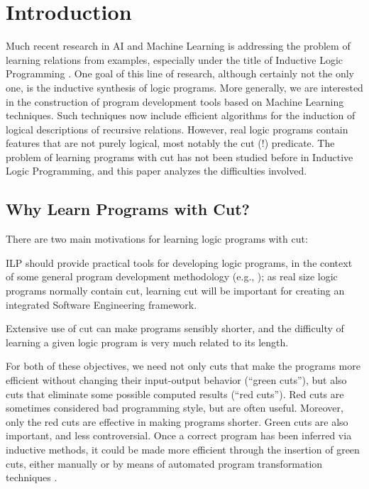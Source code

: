 \small
\normalsize
 
\section{Introduction}
 
Much recent research in AI and Machine Learning
is addressing the problem of learning
relations from examples, especially under the
title of Inductive Logic Programming
\cite{muggilpw91}.
One goal of this line of research,
although certainly not the only one, is the
inductive synthesis of logic programs. More generally,
we are interested in the
construction of program development tools
based on Machine Learning techniques.
Such techniques now include efficient algorithms for
the induction of logical descriptions of recursive relations.
However, real logic programs contain features that are not
purely logical, most notably the cut (!) predicate.
The problem of learning programs with cut has
not been studied before in Inductive Logic Programming,
and this paper analyzes the difficulties involved.
 
\subsection{Why Learn Programs with Cut?}
 
There are two main motivations for learning logic programs
with cut:
 
\begin{enumerate}
\begin{item}
ILP should provide practical tools for developing logic programs,
in the context of some general program development methodology
(e.g., \cite{bergsigs93});
as real size
logic programs normally contain cut, learning cut will
be important for creating an integrated Software
Engineering framework.
\end{item}
\begin{item}
Extensive use of cut can make programs sensibly shorter, and
the difficulty of learning a given logic program is
very much related to its length.
\end{item}
\end{enumerate}
 
For both of these objectives, we need not only cuts that
make the programs more efficient without changing their input-output
behavior (``green cuts''), but also cuts
that eliminate some possible computed results (``red cuts'').
Red cuts are sometimes considered
bad programming style, but are often useful.
Moreover, only the red cuts
are effective in making programs shorter.
Green cuts are also important, and less controversial.
Once a correct program has been inferred via inductive methods,
it could be made more efficient through the insertion of
green cuts, either manually or by means of automated
program transformation techniques \cite{lopstrwo93}.
 
